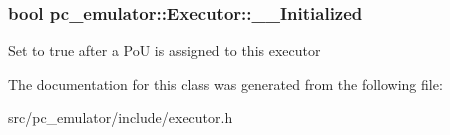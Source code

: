 \subsubsection[{\texorpdfstring{\+\_\+\+\_\+\+Initialized}{__Initialized}}]{\setlength{\rightskip}{0pt plus 5cm}bool pc\+\_\+emulator\+::\+Executor\+::\+\_\+\+\_\+\+Initialized}\hypertarget{classpc__emulator_1_1Executor_a8c58feead8d23b32927237f2f6fc5c7a}{}\label{classpc__emulator_1_1Executor_a8c58feead8d23b32927237f2f6fc5c7a}
Set to true after a PoU is assigned to this executor 

The documentation for this class was generated from the following file\+:\begin{DoxyCompactItemize}
\item 
src/pc\+\_\+emulator/include/executor.\+h\end{DoxyCompactItemize}
